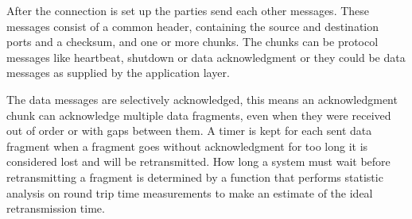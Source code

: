 After the connection is set up the parties send each other messages. These messages consist of a common header, containing the source and destination ports and a checksum, and one or more chunks. The chunks can be protocol messages like heartbeat, shutdown or data acknowledgment or they could be data messages as supplied by the application layer.

The data messages are selectively acknowledged, this means an acknowledgment chunk can acknowledge multiple data fragments, even when they were received out of order or with gaps between them. A timer is kept for each sent data fragment when a fragment goes without acknowledgment for too long it is considered lost and will be retransmitted. 
How long a system must wait before retransmitting a fragment is determined by a function that performs statistic analysis on round trip time measurements to make an estimate of the ideal retransmission time. 
